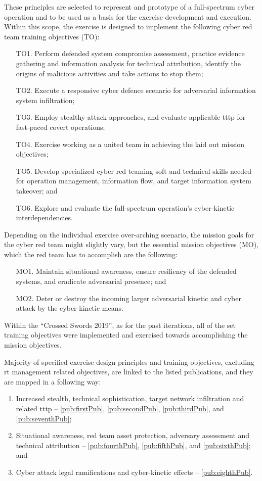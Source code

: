 These principles are selected to represent and prototype of a full-spectrum cyber operation and to be used as a basis for the exercise development and execution.
Within this scope, the exercise is designed to implement the following cyber red team training objectives (TO):
\begin{enumerate}
    \item [TO1.] Perform defended system compromise assessment, practice evidence gathering and information analysis for technical attribution, identify the origins of malicious activities and take actions to stop them;
    \item [TO2.] Execute a responsive cyber defence scenario for adversarial information system infiltration;
    \item [TO3.] Employ stealthy attack approaches, and evaluate applicable \gls{tttp} for fast-paced covert operations;
    \item [TO4.] Exercise working as a united team in achieving the laid out mission objectives;
    \item [TO5.] Develop specialized cyber red teaming soft and technical skills needed for operation management, information flow, and target information system takeover; and
    \item [TO6.] Explore and evaluate the full-spectrum operation's cyber-kinetic interdependencies.
\end{enumerate}

Depending on the individual exercise over-arching scenario, the mission goals for the cyber red team might slightly vary, but the essential mission objectives (MO), which the red team has to accomplish are the following:
\begin{enumerate}
    \item [MO1.] Maintain situational awareness, ensure resiliency of the defended systems, and eradicate adversarial presence; and
    \item [MO2.] Deter or destroy the incoming larger adversarial kinetic and cyber attack by the cyber-kinetic means.
\end{enumerate}
Within the ``Crossed Swords 2019'', as for the past iterations, all of the set training objectives were implemented and exercised towards accomplishing the mission objectives.

Majority of specified exercise design principles and training objectives, excluding \gls{rt} management related objectives, are linked to the listed publications, and they are mapped in a following way:
\begin{enumerate}
    \item Increased stealth, technical sophistication, target network infiltration and related \gls{tttp} -- \ref{pub:firstPub}, \ref{pub:secondPub}, \ref{pub:thirdPub}, and \ref{pub:seventhPub};
    \item Situational awareness, red team asset protection, adversary assessment and technical attribution -- \ref{pub:fourthPub}, \ref{pub:fifthPub}, and \ref{pub:sixthPub}; and
    \item Cyber attack legal ramifications and cyber-kinetic effects -- \ref{pub:eighthPub}.
\end{enumerate}

